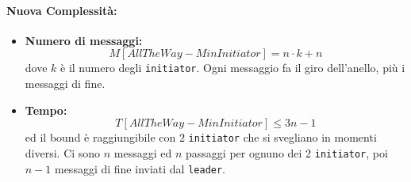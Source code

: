 \paragraph{Nuova Complessità:}
\begin{itemize}
	\item \textbf{Numero di messaggi:}
	$$ M[AllTheWay - MinInitiator] = n \cdot k + n $$
	dove $k$ è il numero degli \texttt{initiator}. Ogni messaggio fa il giro dell'anello, più i messaggi di fine.\\
	
	\item \textbf{Tempo:}
	$$ T[AllTheWay - MinInitiator] \leq 3n - 1 $$
	ed il bound è raggiungibile con $2$ \texttt{initiator} che si svegliano in momenti diversi. Ci sono $n$ messaggi ed $n$ passaggi per ognuno dei 2 \texttt{initiator}, poi $n-1$ messaggi di fine inviati dal \texttt{leader}.\\
\end{itemize}

